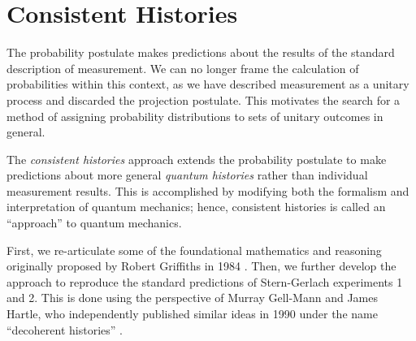 \usetikzlibrary{shapes.geometric}
\usetikzlibrary{positioning}

\chapter{Consistent Histories}

The probability postulate makes predictions about the results of the standard description of measurement. We can no longer frame the calculation of probabilities within this context, as we have  described measurement as a unitary process and discarded the projection postulate. This motivates the search for a method of assigning probability distributions to sets of unitary outcomes in general.

The \textit{consistent histories} approach extends the probability postulate to make predictions about  more general \textit{quantum histories} rather than individual measurement results. This is accomplished by modifying both the formalism and interpretation of quantum mechanics; hence, consistent histories is called an ``approach'' to quantum mechanics.

First, we re-articulate some of the foundational mathematics and reasoning originally proposed by Robert Griffiths in 1984 \cite{old_griffiths}. Then, we further develop the approach to reproduce the standard predictions of Stern-Gerlach experiments 1 and 2. This is done using the perspective of Murray Gell-Mann and James Hartle, who independently published similar ideas in 1990 under the name ``decoherent histories'' \cite{gell}.

%
%
%
%


